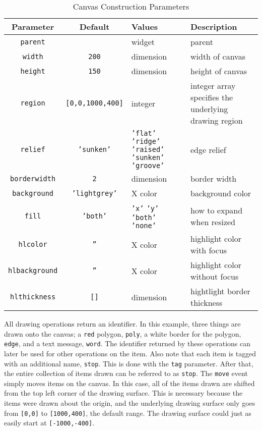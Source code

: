 \begin{table}[tbh]
{\small
\begin{center}
\begin{tabular}{|c|c|p{1.6in}|p{1.9in}|}
\hline
Parameter & Default & Values & Description \\
\hline
\hline
{\tt parent}		& 		& widget & parent \\ \hline
{\tt width}		& {\tt 200}	& dimension & width of canvas \\ \hline
{\tt height}		& {\tt 150}	& dimension & height of canvas \\ \hline
{\tt region}		& \verb+[0,0,1000,400]+ & integer & integer array specifies the underlying drawing region \\ \hline
{\tt relief}		& {\tt 'sunken'}& {\tt 'flat'} {\tt 'ridge'} {\tt 'raised'} {\tt 'sunken'} {\tt 'groove'} & edge relief \\ \hline
{\tt borderwidth}	& {\tt 2}	& dimension & border width \\ \hline
{\tt background}	& {\tt 'lightgrey'}& X color & background color \\ \hline
{\tt fill}		& {\tt 'both'}	& {\tt 'x'} {\tt 'y'} {\tt 'both'} {\tt 'none'} & how to expand when resized \\ \hline
{\tt hlcolor}		& {\tt ''}	& X color & highlight color with focus \\ \hline
{\tt hlbackground}	& {\tt ''}	& X color & highlight color without focus \\ \hline
{\tt hlthickness}	& {\tt []}	& dimension & hightlight border thickness \\ \hline
\end{tabular}
\end{center}
}
\caption{ Canvas Construction Parameters }
\label{tkcanvas-params}
\end{table}

All drawing operations return an identifier. In this example,
three things are drawn onto the canvas; a {\tt red} polygon, {\tt poly}, a white
border for the polygon, {\tt edge}, and a text message, {\tt word}. The identifier
returned by these operations can later be used for other operations on the item.
Also note that each item is tagged with an additional name, {\tt stop}. This
is done with the {\tt tag} parameter. After that, the entire collection of items
drawn can be referred to as {\tt stop}. The {\tt move} event simply moves items
on the canvas. In this case, all of the items drawn are shifted from the top
left corner of the drawing surface. This is necessary because the items were
drawn about the origin, and the underlying drawing surface only goes from
\verb+[0,0]+ to \verb+[1000,400]+, the default range. The drawing surface could
just as easily start at \verb+[-1000,-400]+.

